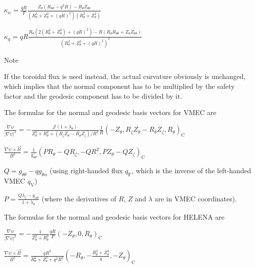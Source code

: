 $\kappa_n = \frac{q R}{F} \frac{Z_\theta \left( R_{\theta\theta} - q^2 R\right) - R_\theta Z_{\theta\theta}} {\left(R_\theta^2 + Z_\theta^2 + \left(q R\right)^2\right) \left( R_\theta^2 + Z_\theta^2 \right)} $

$\kappa_g = q R \frac{R_\theta \left( 2 \left(R_\theta^2 + Z_\theta^2\right) + \left(qR\right)^2 \right) - R \left(R_\theta R_{\theta\theta} + Z_\theta Z_{\theta\theta}\right)} {\left(R_\theta^2 + Z_\theta^2 + \left(q R\right)^2\right)^2} $

\begin{DoxyNote}{Note}

\begin{DoxyEnumerate}
\item If the toroidal flux is used instead, the actual curvature obviously is unchanged, which implies that the normal component has to be multiplied by the safety factor and the geodesic component has to be divided by it.
\item The formulas for the normal and geodesic basis vectors for V\+M\+EC are
\begin{DoxyItemize}
\item $\frac{\nabla \psi}{\left|\nabla\psi\right|^2} = -\frac{\mathcal{J} \left(1 + \lambda_\theta\right)} {Z_\theta^2 + R_\theta^2 + \left(R_\zeta Z_\theta - R_\theta Z_\zeta \right)/R^2} \frac{1}{R} \left( -Z_\theta , R_\zeta Z_\theta - R_\theta Z_\zeta, R_\theta\right)_\text{C}$
\item $\frac{\nabla \psi \times \vec{B}}{B^2} = \frac{1}{g_{\theta\theta}} \left(P R_\theta - Q R_\zeta, -Q R^2, P Z_\theta - Q Z_\zeta\right)_\text{C}$
\item $Q = g_{\theta\theta} - q g_{\theta\alpha}$ (using right-\/handed flux $q_\text{F}$, which is the inverse of the left-\/handed V\+M\+EC $q_\text{V}$)
\item $P = \frac{Q \lambda_\zeta - g_{\alpha\theta}}{1+\lambda_\theta}$ (where the derivatives of $R$, $Z$ and $\lambda$ are in V\+M\+EC coordinates).
\end{DoxyItemize}
\item The formulas for the normal and geodesic basis vectors for H\+E\+L\+E\+NA are
\begin{DoxyItemize}
\item $\frac{\nabla \psi}{\left|\nabla\psi\right|^2} = -\frac{1}{Z_\theta^2 + R_\theta^2} \frac{q R}{F} \left( -Z_\theta , 0, R_\theta\right)_\text{C}$
\item $\frac{\nabla \psi \times \vec{B}}{B^2} = \frac{q R^2}{R_\theta^2 + Z_\theta^2 + q^2 R^2} \left(-R_\theta, -\frac{R_\theta^2 + Z_\theta^2}{q}, -Z_\theta\right)_\text{C}$
\end{DoxyItemize}
\end{DoxyEnumerate}
\end{DoxyNote}

